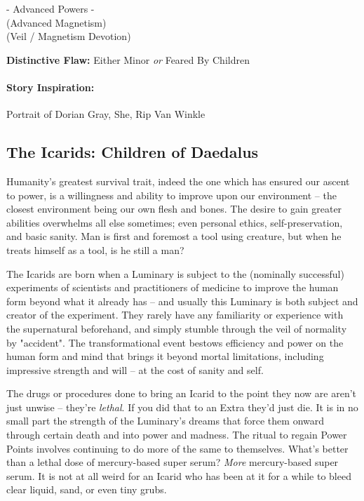 - Advanced Powers -\\
 (Advanced Magnetism)\\
 (Veil / Magnetism Devotion)

\textbf{Distinctive Flaw:} Either Minor \textit{or} Feared By Children

\paragraph{Story Inspiration:} Portrait of Dorian Gray, She, Rip Van Winkle

\subsection[Icarids]{The Icarids: Children of Daedalus} 

Humanity's greatest survival trait, indeed the one which has ensured our ascent to power, is a willingness and ability to improve upon our environment -- the closest environment being our own flesh and bones. The desire to gain greater abilities overwhelms all else sometimes; even personal ethics, self-preservation, and basic sanity. Man is first and foremost a tool using creature, but when he treats himself as a tool, is he still a man?

The Icarids are born when a Luminary is subject to the (nominally successful) experiments of scientists and practitioners of medicine to improve the human form beyond what it already has -- and usually this Luminary is both subject and creator of the experiment. They rarely have any familiarity or experience with the supernatural beforehand, and simply stumble through the veil of normality by "accident". The transformational event bestows efficiency and power on the human form and mind that brings it beyond mortal limitations, including impressive strength and will -- at the cost of sanity and self. 

The drugs or procedures done to bring an Icarid to the point they now are aren't just unwise -- they're \textit{lethal}. If you did that to an Extra they'd just die. It is in no small part the strength of the Luminary's dreams that force them onward through certain death and into power and madness. The ritual to regain Power Points involves continuing to do more of the same to themselves. What's better than a lethal dose of mercury-based super serum? \textit{More} mercury-based super serum. It is not at all weird for an Icarid who has been at it for a while to bleed clear liquid, sand, or even tiny grubs.

